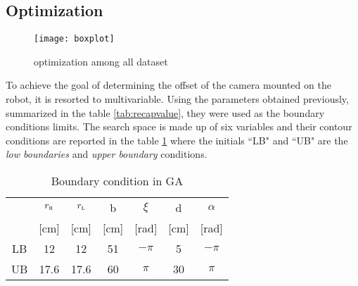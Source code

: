 \subsection{Optimization}
\begin{figure*}[htb]
\centering
\texttt{[image: boxplot]}
\caption{optimization among all dataset}
\label{fig:boxplot}
\end{figure*}
To achieve the goal of determining the offset of the camera mounted on the robot, it is resorted to multivariable.
Using the parameters obtained previously, summarized in the table \ref{tab:recapvalue}, they were used as the boundary conditions limits.
The search space is made up of six variables and their contour conditions are reported in the table \ref{tab:BoundConditionGA} where the initials “LB" and “UB" are the \emph{low boundaries} and \emph{upper boundary} conditions.

\begin{table}[!h]
\centering
\begin{adjustbox}{max width=0.45\textwidth}
\begin{tabular}{ccccccc}
\hline
	&$r_\textsc{r}$ 	& $r_\textsc{l}$	&   b 	& $\xi$		&  d 	& $\alpha$\\
	&   [cm] 		&    [cm]		& [cm]	&  [rad]		& [cm] 	&  [rad]\\
\hline
LB	&	12  			& 	12  			& 	51 	&	$-\pi$ 	& 	5 	&	$-\pi$\\     
UB 	& 	17.6 		&	17.6 		&	60 	& 	$\pi$ 	&	30	&	$\pi$\\ 
\hline
\end{tabular}
\end{adjustbox}
\caption{Boundary condition in GA}
\label{tab:BoundConditionGA}
\end{table}

